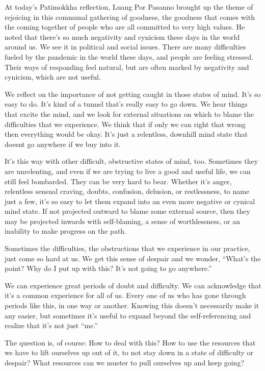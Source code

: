 At today's Patimokkha reflection, Luang Por Pasanno brought up the theme of rejoicing in this communal gathering of goodness, the goodness that comes with the coming together of people who are all committed to very high values. He noted that there's so much negativity and cynicism these days in the world around us. We see it in political and social issues. There are many difficulties fueled by the pandemic in the world these days, and people are feeling stressed. Their ways of responding feel natural, but are often marked by negativity and cynicism, which are not useful.~

We reflect on the importance of not getting caught in those states of mind. It's so easy to do. It's kind of a tunnel that's really easy to go down. We hear things that excite the mind, and we look for external situations on which to blame the difficulties that we experience. We think that if only we can right that wrong then everything would be okay. It's just a relentless, downhill mind state that doesn\textquotesingle t go anywhere if we buy into it.~

It's this way with other difficult, obstructive states of mind, too. Sometimes they are unrelenting, and even if we are trying to live a good and useful life, we can still feel bombarded. They can be very hard to bear. Whether it's anger, relentless sensual craving, doubts, confusion, delusion, or restlessness, to name just a few, it's so easy to let them expand into an even more negative or cynical mind state. If not projected outward to blame some external source, then they may be projected inwards with self-blaming, a sense of worthlessness, or an inability to make progress on the path.

Sometimes the difficulties, the obstructions that we experience in our practice, just come so hard at us. We get this sense of despair and we wonder, ``What's the point? Why do I put up with this? It's not going to go anywhere.''

We can experience great periods of doubt and difficulty. We can acknowledge that it's a common experience for all of us. Every one of us who has gone through periods like this, in one way or another. Knowing this doesn't necessarily make it any easier, but sometimes it's useful to expand beyond the self-referencing and realize that it's not just ``me.''

The question is, of course: How to deal with this? How to use the resources that we have to lift ourselves up out of it, to not stay down in a state of difficulty or despair? What resources can we muster to pull ourselves up and keep going?~

